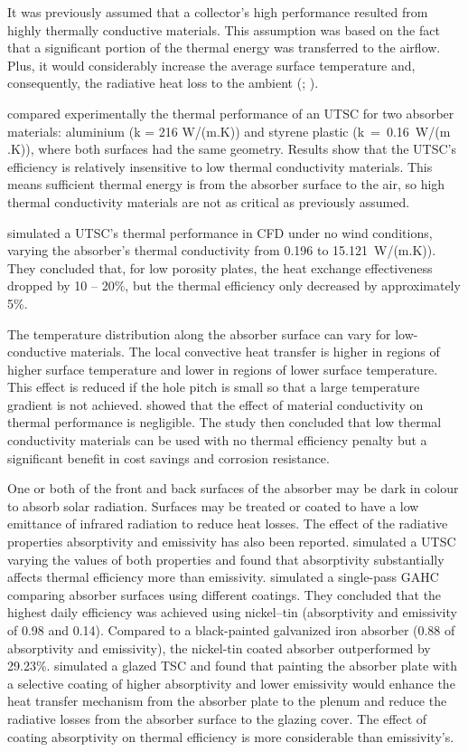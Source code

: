 It was previously assumed that a collector's high performance resulted from highly thermally conductive materials. This assumption was based on the fact that a significant portion of the thermal energy was transferred to the airflow. Plus, it would considerably increase the average surface temperature and, consequently, the radiative heat loss to the ambient (\cite{Gawlik2002}; \cite{Gawlik2005}).

\citet{Christensen1997} compared experimentally the thermal performance of an UTSC for two absorber materials: aluminium (k = 216 W/(m.K)) and styrene plastic (k~=~0.16~W/(m .K)), where both surfaces had the same geometry. Results show that the UTSC's efficiency is relatively insensitive to low thermal conductivity materials. This means sufficient thermal energy is from the absorber surface to the air, so high thermal conductivity materials are not as critical as previously assumed.

\citet{Arulanandam1999} simulated a UTSC's thermal performance in CFD under no wind conditions, varying the absorber's thermal conductivity from 0.196 to 15.121~W/(m.K)). They concluded that, for low porosity plates, the heat exchange effectiveness dropped by 10 -- 20\%, but the thermal efficiency only decreased by approximately 5\%.

The temperature distribution along the absorber surface can vary for low-conductive materials. The local convective heat transfer is higher in regions of higher surface temperature and lower in regions of lower surface temperature. This effect is reduced if the hole pitch is small so that a large temperature gradient is not achieved. \citet{Gawlik2005} showed that the effect of material conductivity on thermal performance is negligible. The study then concluded that low thermal conductivity materials can be used with no thermal efficiency penalty but a significant benefit in cost savings and corrosion resistance.

One or both of the front and back surfaces of the absorber may be dark in colour to absorb solar radiation. Surfaces may be treated or coated to have a low emittance of infrared radiation to reduce heat losses. The effect of the radiative properties absorptivity and emissivity has also been reported. \citet{Leon2007} simulated a UTSC varying the values of both properties and found that absorptivity substantially affects thermal efficiency more than emissivity. \citet{El-Sebaii2010} simulated a single-pass GAHC comparing absorber surfaces using different coatings. They concluded that the highest daily efficiency was achieved using nickel–tin (absorptivity and emissivity of 0.98 and 0.14). Compared to a black-painted galvanized iron absorber (0.88 of absorptivity and emissivity), the nickel-tin coated absorber outperformed by 29.23\%. \citet{Li2016} simulated a glazed TSC and found that painting the absorber plate with a selective coating of higher absorptivity and lower emissivity would enhance the heat transfer mechanism from the absorber plate to the plenum and reduce the radiative losses from the absorber surface to the glazing cover. The effect of coating absorptivity on thermal efficiency is more considerable than emissivity's.

